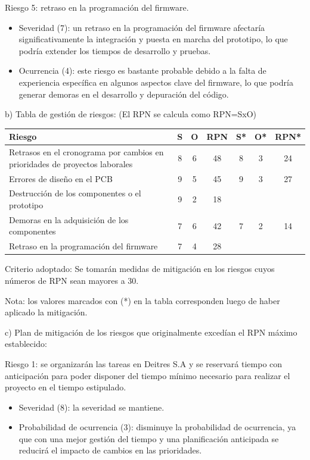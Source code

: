 \documentclass[
11pt, %
]{charter}
\begin{document}
Riesgo 5: retraso en la programación del firmware.
\begin{itemize}
	\item Severidad (7): un retraso en la programación del firmware afectaría significativamente la integración y puesta en marcha del prototipo, lo que podría extender los tiempos de desarrollo y pruebas.\\
	\item Ocurrencia (4):  este riesgo es bastante probable debido a la falta de experiencia específica en algunos aspectos clave del firmware, lo que podría generar demoras en el desarrollo y depuración del código.\\
\end{itemize}   

b) Tabla de gestión de riesgos:      (El RPN se calcula como RPN=SxO)

\begin{table}[htpb]
\centering
\begin{tabularx}{\linewidth}{@{}|X|c|c|c|c|c|c|@{}}
\hline
\rowcolor[HTML]{C0C0C0} 
Riesgo &                                                                                                                         S & O & RPN & S* & O* & RPN* \\ \hline
Retrasos en el cronograma por cambios en prioridades de proyectos laborales &   	8&  6 &     48&    8&   3&     24  \\ \hline
Errores de diseño en el PCB&   				 					9&   5&     45&    9&   3&     27  \\ \hline
Destrucción de los componentes o el prototipo&  						9&   2&     18&      &     &           \\ \hline
Demoras en la adquisición de los componentes&   						7&   6&     42&    7&   2&     14  \\ \hline
Retraso en la programación del firmware &  		 					7&   4&    28&       &     &           \\ \hline
\end{tabularx}%
\end{table}

Criterio adoptado: Se tomarán medidas de mitigación en los riesgos cuyos números de RPN sean mayores a 30.

Nota: los valores marcados con (*) en la tabla corresponden luego de haber aplicado la mitigación.

c) Plan de mitigación de los riesgos que originalmente excedían el RPN máximo establecido:
 
Riesgo 1: se organizarán las tareas en Deitres S.A y se reservará tiempo con anticipación para poder disponer del tiempo mínimo necesario para realizar el proyecto en el tiempo estipulado.
  \begin{itemize}
	\item Severidad (8): la severidad se mantiene.
	\item Probabilidad de ocurrencia (3): disminuye la probabilidad de ocurrencia, ya que con una mejor gestión del tiempo y una planificación anticipada se reducirá el impacto de cambios en las prioridades.
	\end{itemize}
\end{document}
